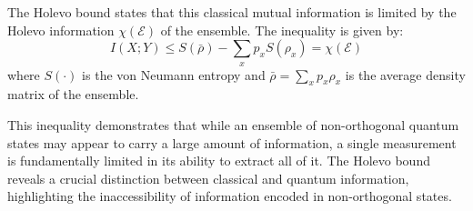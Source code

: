 The Holevo bound states that this classical mutual information is limited by
the Holevo information $\chi(\mathcal{E})$ of the ensemble.
The inequality is given by:
\begin{equation}
    I(X; Y) \leq S(\bar{\rho}) - \sum_x p_x S(\rho_x) = \chi(\mathcal{E})
\end{equation}
where $S(\cdot)$ is the von Neumann entropy and $\bar{\rho} = \sum_x p_x \rho_x$
is the average density matrix of the ensemble.

This inequality demonstrates that while an ensemble of non-orthogonal quantum
states may appear to carry a large amount of information, a single measurement
is fundamentally limited in its ability to extract all of it.
The Holevo bound reveals a crucial distinction between classical and quantum
information, highlighting the inaccessibility of information encoded in non-orthogonal states.
